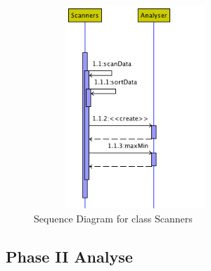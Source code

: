 \begin{description}
\begin{figure}[h]
    \centering
    \includegraphics[width=3in, height=3in]{figures/sequence_scanners}
    \caption[Sequence Diagram for class Scanners]{Sequence Diagram for class Scanners}
    \label{fig:figure4_22}
\end{figure}

\end{description}

\subsection{Phase II Analyse}

